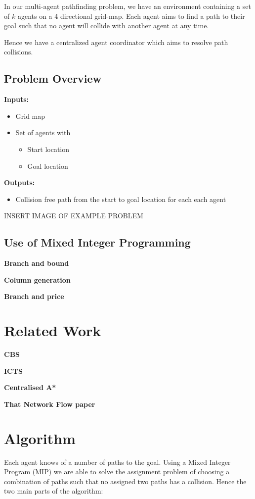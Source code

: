 \documentclass[a4paper,11pt]{article}
\begin{document}
In our multi-agent pathfinding problem, we have an environment containing a set of $k$ agents on a 4 directional grid-map. Each agent aims to find a path to their goal such that no agent will collide with another agent at any time.

Hence we have a centralized agent coordinator which aims to resolve path collisions.

\subsection{Problem Overview}
\noindent \textbf{Inputs:}
\begin{itemize}
	\item Grid map
	\item Set of agents with
	\begin{itemize}
		\item Start location
		\item Goal location
	\end{itemize}
\end{itemize}

\noindent \textbf{Outputs:}
\begin{itemize}
	\item Collision free path from the start to goal location for each each agent
\end{itemize}

\begin{Large}
	INSERT IMAGE OF EXAMPLE PROBLEM
\end{Large}



\subsection{Use of Mixed Integer Programming}
\noindent \textbf{Branch and bound}

\noindent \textbf{Column generation}

\noindent \textbf{Branch and price}

\section{Related Work}
\textbf{CBS}

\textbf{ICTS}

\textbf{Centralised A*}

\textbf{That Network Flow paper}

\section{Algorithm}
Each agent knows of a number of paths to the goal. Using a Mixed Integer Program (MIP) we are able to solve the assignment problem of choosing a combination of paths such that no assigned two paths has a collision. Hence the two main parts of the algorithm:
\end{document}

